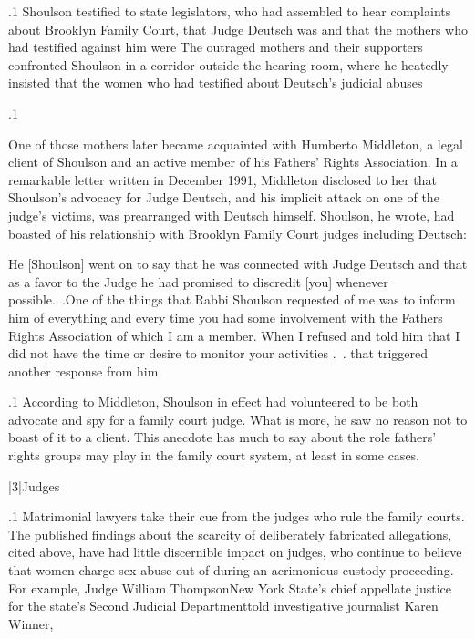 \documentclass[11pt, twoside]{article}
\begin{document}
{\p.1{%
\:Shoulson testified to state legislators, who had assembled to hear
complaints about Brooklyn Family Court, that Judge Deutsch was  and that the mothers who had testified against
him were  The outraged mothers and their supporters
confronted Shoulson in a corridor outside the hearing room, where
he heatedly insisted that the women who had testified about Deutsch’s
judicial abuses \;
}%

\p.1{%
\:One of those mothers later became acquainted with Humberto Middleton, a legal client of Shoulson and an active member of his Fathers’
Rights Association. In a remarkable letter written in December 1991,
Middleton disclosed to her that Shoulson’s advocacy for Judge Deutsch,
and his implicit attack on one of the judge’s victims, was prearranged
with Deutsch himself. Shoulson, he wrote, had boasted of his relationship with Brooklyn Family Court judges including Deutsch:

\begin{blockQuote}
He [Shoulson] went on to say that he was connected with Judge
Deutsch and that as a favor to the Judge he had promised to discredit [you] whenever possible.~.\@ One of the things that Rabbi
Shoulson requested of me was to inform him of everything and
every time you had some involvement with the Fathers Rights Association of which I am a member. When I refused and told him
that I did not have the time or desire to
monitor your activities .~. that triggered another response from him.
\end{blockQuote}
\;
}%

\p.1{%
\:According to Middleton, Shoulson in effect had volunteered to be
both advocate and spy for a family court judge. What is more, he saw no
reason not to boast of it to a client. This anecdote has much to say about
the role fathers’ rights groups may play in the family court system, at
least in some cases.\;
}%


\s|3|{Judges}

\p.1{%
\noindent{}\:Matrimonial lawyers take their cue from the judges who rule the family courts. The published findings about the scarcity of deliberately
fabricated allegations, cited above, have had little discernible impact on judges, who continue to believe that women charge sex abuse
out of  during an acrimonious custody proceeding. For
example, Judge William Thompson\mdash{}New York State’s chief appellate
justice for the state’s Second Judicial Department\mdash{}told investigative
journalist Karen Winner, \;
}%

}
\end{document}
